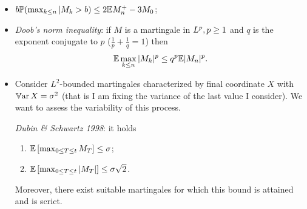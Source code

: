 \documentclass{report}
\begin{document}
\begin{itemize}
	\item $b\mathbb{P}(\max_{k\leq n}|M_{k}>b)\leq 2\mathbb{E} M_{n}^{+}-3M_{0}$;
	\item \emph{Doob's norm inequality}: if $M$ is a martingale in $L^{p},p\geq 1$ and $q$ is the exponent conjugate to $p$ ($\frac{1}{p}+\frac{1}{q}=1$) then
	\begin{equation*}
		\mathbb{E}\max_{  k\leq n}|M_{k}|^{p}\leq q^{p}\mathbb{E}|M_{n}|^{p}.
	\end{equation*}
	\item  Consider $L^{2}$-bounded martingales characterized by final coordinate $X$ with $\mathbb{V}\mathrm{ar}\, X=\sigma^{2}$ (that is I am fixing the variance of the last value I consider). We want to assess the variability of this process.
	\begin{theorem}
		\emph{Dubin \& Schwartz 1998}: it holds
		\begin{enumerate}
			\item $\mathbb{E}\left[\max_{0\leq T\leq t}M_{T}\right]\leq\sigma$;
			\item $\mathbb{E}\left[\max_{0\leq T\leq t}|M_{T}|\right]\leq\sigma\sqrt{2}$.
		\end{enumerate}
		Moreover, there exist suitable martingales for which this bound is attained and is scrict.
	\end{theorem}
\end{itemize}
\end{document}
